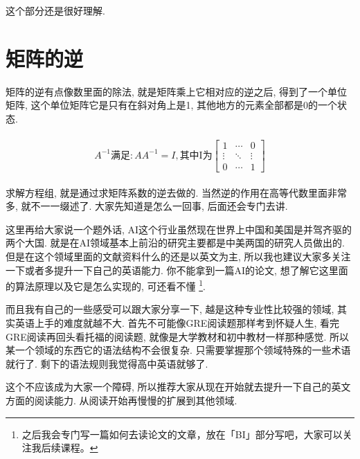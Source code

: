 这个部分还是很好理解. 

\section{矩阵的逆}

矩阵的逆有点像数里面的除法, 就是矩阵乘上它相对应的逆之后, 得到了一个单位矩阵, 这个单位矩阵它是只有在斜对角上是1, 其他地方的元素全部都是0的一个状态. 

\begin{align*}
  \begin{split}
    A^{-1}\mbox{满足}:AA^{-1}=I, \mbox{其中I为}
    \begin{bmatrix} 1 & \cdots & 0 \\ \vdots & \ddots &\vdots \\ 0 & \cdots & 1 \end{bmatrix}
  \end{split}
\end{align*}

求解方程组, 就是通过求矩阵系数的逆去做的. 当然逆的作用在高等代数里面非常多, 就不一一缀述了. 大家先知道是怎么一回事, 后面还会专门去讲. 

这里再给大家说一个题外话, AI这个行业虽然现在世界上中国和美国是并驾齐驱的两个大国. 就是在AI领域基本上前沿的研究主要都是中美两国的研究人员做出的. 但是在这个领域里面的文献资料什么的还是以英文为主, 所以我也建议大家多关注一下或者多提升一下自己的英语能力. 你不能拿到一篇AI的论文, 想了解它这里面的算法原理以及它是怎么实现的, 可还看不懂 \footnote{之后我会专门写一篇如何去读论文的文章，放在「BI」部分写吧，大家可以关注我后续课程。}. 

而且我有自己的一些感受可以跟大家分享一下, 越是这种专业性比较强的领域, 其实英语上手的难度就越不大. 首先不可能像GRE阅读题那样考到怀疑人生, 看完GRE阅读再回头看托福的阅读题, 就像是大学教材和初中教材一样那种感觉. 所以某一个领域的东西它的语法结构不会很复杂. 只需要掌握那个领域特殊的一些术语就行了. 剩下的语法规则我觉得高中英语就够了. 

这个不应该成为大家一个障碍, 所以推荐大家从现在开始就去提升一下自己的英文方面的阅读能力. 从阅读开始再慢慢的扩展到其他领域. 